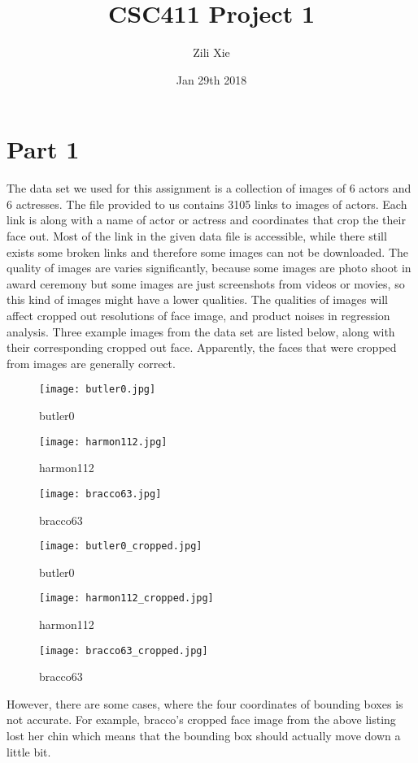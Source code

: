 \documentclass{article}
\title{CSC411 Project 1}
\author{Zili Xie}
\date{Jan 29th 2018}
\begin{document}
\maketitle
\section*{Part 1}
\Large The data set we used for this assignment is a collection of images of 6 actors and 6 actresses. The file provided to us contains 3105 links to images of actors. Each link is along with a name of actor or actress and coordinates that crop the their face out. Most of the link in the given data file is accessible, while there still exists some broken links and therefore some images can not be downloaded. The quality of images are varies significantly, because some images are photo shoot in award ceremony but some images are just screenshots from videos or movies, so this kind of images might have a lower qualities. The qualities of images will affect cropped out resolutions of face image, and product noises in regression analysis.
\newline
Three example images from the data set are listed below, along with their corresponding cropped out face. Apparently, the faces that were cropped from images are generally correct.

\begin{figure}[!htb]
  \texttt{[image: butler0.jpg]}
  \caption*{butler0}\label{fig:baldwin}
\endminipage\hfill
{}
  \texttt{[image: harmon112.jpg]}
  \caption*{harmon112}\label{fig:hader}
\endminipage\hfill
{}%
  \texttt{[image: bracco63.jpg]}
  \caption*{bracco63}\label{fig:ferrera}
\endminipage
\end{figure}
\begin{figure}[!htb]
  \texttt{[image: butler0\_cropped.jpg]}
  \caption*{butler0}\label{fig:baldwin}
\endminipage\hfill
{}
  \texttt{[image: harmon112\_cropped.jpg]}
  \caption*{harmon112}\label{fig:hader}
\endminipage\hfill
{}%
  \texttt{[image: bracco63\_cropped.jpg]}
  \caption*{bracco63}\label{fig:ferrera}
\endminipage
\end{figure}
\noindent However, there are some cases, where the four coordinates of bounding boxes is not accurate. For example, bracco's cropped face image from the above listing lost her chin which means that the bounding box should actually move down a little bit.
\end{document}
